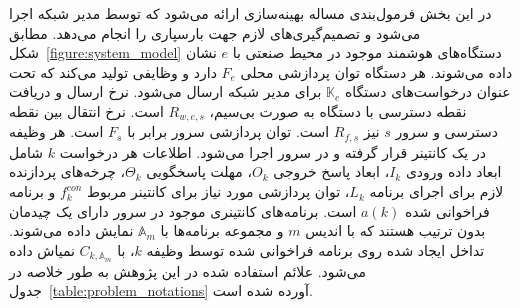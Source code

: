 در این بخش فرمول‌بندی مساله بهینه‌سازی ارائه می‌شود که توسط مدیر شبکه اجرا می‌شود و تصمیم‌گیری‌های لازم جهت بارسپاری را انجام می‌دهد. مطابق شکل~\ref{figure:system_model} دستگاه‌های هوشمند موجود در محیط صنعتی با $e$ نشان داده می‌شوند. هر دستگاه توان پردازشی محلی $F_e$ دارد و وظایفی تولید می‌کند که تحت عنوان درخواست‌های دستگاه $\mathbb{K}_e$ برای مدیر شبکه ارسال می‌شود. نرخ ارسال و دریافت نقطه دسترسی با دستگاه به صورت بی‌سیم، $R_{w,e,s}$ است. نرخ انتقال بین نقطه دسترسی و سرور $s$ نیز $R_{f,s}$ است. توان پردازشی سرور برابر با $F_s$ است. هر وظیفه در یک کانتینر قرار گرفته و در سرور اجرا می‌شود. اطلاعات هر درخواست $k$ شامل ابعاد داده ورودی $I_k$، ابعاد پاسخ خروجی $O_k$، مهلت پاسخگویی $\Theta_k$، چرخه‌های پردازنده لازم برای اجرای برنامه $L_k$، توان پردازشی مورد نیاز برای کانتینر مربوط $f^{con}_k$  و برنامه فراخوانی شده $a(k)$ است. برنامه‌های کانتینری موجود در سرور دارای یک چیدمان بدون ترتیب هستند که با اندیس $m$ و مجموعه برنامه‌ها با $\mathbb{A}_m$ نمایش داده می‌شوند. تداخل ایجاد شده روی برنامه فراخوانی شده توسط وظیفه $k$، با $C_{k,\mathbb{A}_m}$ نمیاش داده می‌شود. علائم استفاده شده در این پژوهش به طور خلاصه در جدول~\ref{table:problem_notations} آورده شده است.

